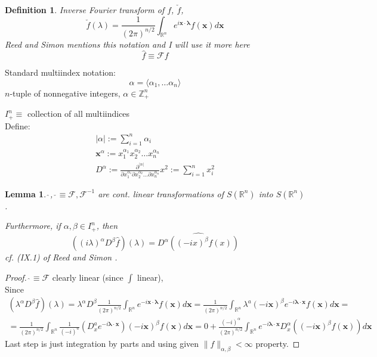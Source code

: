 \documentclass[10pt]{amsart}
\newtheorem{lemma}{Lemma}
\newtheorem{definition}{Definition}
\begin{document}
\begin{multicols*}{2}
\begin{definition}
	Inverse Fourier transform of $f$, $\check{f}$, 
	\[
	\check{f}(\lambda) = \frac{1}{(2\pi)^{n/2}} \int_{\mathbb{R}^n} e^{i\mathbf{x}\cdot \mathbf{\lambda} } f(\mathbf{x}) d\mathbf{x} 
	\]
	Reed and Simon \cite{ReSi1980} mentions this notation and I will use it more here
	\[
	\widehat{f} \equiv \mathcal{F} f
	\]
\end{definition}

Standard multiindex notation:  
\[
\alpha = \langle \alpha_1, \dots \alpha_n \rangle
\]
$n$-tuple of nonnegative integers, $\alpha \in \mathbb{Z}_+^n$  

$I_+^n \equiv $ collection of all multiindices \\
Define: 
\[
\begin{gathered}
	|\alpha | := \sum_{i=1}^n \alpha_i \\
	\mathbf{x}^{\alpha} := x_1^{\alpha_1} x_2^{\alpha_2} \dots  x_n^{\alpha_n} \\
	D^{\alpha} := \frac{\partial^{ |n |} }{ \partial x_1^{\alpha_1} \partial x_2^{\alpha_2} \dots \partial x_n^{\alpha_n} }
x^2 := \sum_{i=1}^n x_i^2 
\end{gathered}
\]

\begin{lemma}
	$ \widehat{ \, } $, $\check{\, } \equiv \mathcal{F}, \mathcal{F}^{-1}$ are cont. linear transformations of $S(\mathbb{R}^n)$ into $S(\mathbb{R}^n)$.  
	
	Furthermore, if $\alpha, \beta \in I_+^n$, then 
	\begin{equation}
	((i\lambda)^{\alpha} D^{\beta}\widehat{f})(\lambda) = \widehat{ D^{\alpha}((-ix)^{\beta}f(x)) }  
	\end{equation}
	cf. (IX.1) of Reed and Simon \cite{ReSi1980}.  
\end{lemma}

\begin{proof}
$\widehat{ \, } \equiv \mathcal{F}$ clearly linear (since $\int$ linear), \\
Since 
\[
\begin{gathered}
	(\lambda^{\alpha} D^{\beta} \widehat{f} )(\lambda) = \lambda^{\alpha} D^{\beta} \frac{1}{(2\pi)^{n/2}} \int_{\mathbb{R}^n } e^{-i\mathbf{x}\cdot \mathbf{\lambda}} f(\mathbf{x})d\mathbf{x} = \frac{1}{ (2\pi)^{n/2}} \int_{\mathbb{R}^n} \lambda^a (-i\mathbf{x})^{\beta} e^{-i\mathbf{\lambda} \cdot \mathbf{x} } f(\mathbf{x}) d\mathbf{x} = \\
	= \frac{1}{ (2\pi)^{n/2}} \int_{\mathbb{R}^n} \frac{1}{(-i)^a} (D_x^a e^{-i\mathbf{\lambda} \cdot \mathbf{x}}) (-i\mathbf{x})^{\beta} f(\mathbf{x}) d\mathbf{x} = 0 + \frac{(-i)^{\alpha} }{ (2\pi)^{n/2}} \int_{\mathbb{R}^n} e^{-i \mathbf{\lambda} \cdot \mathbf{x} } D_x^{\alpha} ((-i\mathbf{x})^{\beta}f(\mathbf{x}))d\mathbf{x} 
\end{gathered}
\]
Last step is just integration by parts and using given $\| f \|_{\alpha, \beta} < \infty$ property.  


\end{proof}
\end{multicols*}
\end{document}
